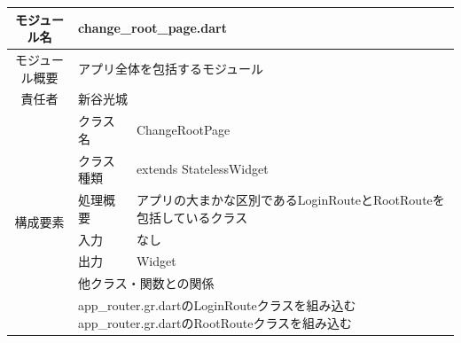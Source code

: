 \begin{table}[H]
  \centering
  \begin{tabular}{|c|l|l|} \hline
    モジュール名                   & \multicolumn{2}{l|}{change\_root\_page.dart}  \\ \hline
    モジュール概要                  & \multicolumn{2}{p{12cm}|}{アプリ全体を包括するモジュール}           \\ \hline
    責任者                  & \multicolumn{2}{l|}{新谷光城}           \\ \hline
    \multirow{7}{*}{構成要素}       & クラス名 &  ChangeRootPage     \\ \cline{2-3}
                               & クラス種類 & extends StatelessWidget \\ \cline{2-3}
                               & 処理概要 & \multicolumn{1}{p{12cm}|}{アプリの大まかな区別であるLoginRouteとRootRouteを包括しているクラス} \\ \cline{2-3}
                               & 入力 & なし \\ \cline{2-3}
                                & 出力 & Widget \\ \cline{2-3}
                                & \multicolumn{2}{l|}{他クラス・関数との関係}  \\ \cline{2-3}
                                & \multicolumn{2}{p{14cm}|}{app\_router.gr.dartのLoginRouteクラスを組み込む
                                \newline app\_router.gr.dartのRootRouteクラスを組み込む}  \\ \hline
  \end{tabular}
\end{table}





